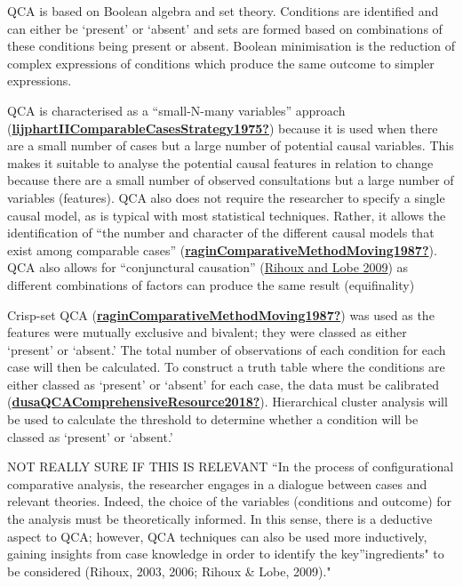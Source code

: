 \documentclass[
]{article}
\begin{document}
QCA is based on Boolean algebra and set theory. Conditions are
identified and can either be `present' or `absent' and sets are formed
based on combinations of these conditions being present or absent.
Boolean minimisation is the reduction of complex expressions of
conditions which produce the same outcome to simpler expressions.

QCA is characterised as a ``small-N-many variables'' approach
(\protect\hyperlink{ref-lijphartIIComparableCasesStrategy1975}{\textbf{lijphartIIComparableCasesStrategy1975?}})
because it is used when there are a small number of cases but a large
number of potential causal variables. This makes it suitable to analyse
the potential causal features in relation to change because there are a
small number of observed consultations but a large number of variables
(features). QCA also does not require the researcher to specify a single
causal model, as is typical with most statistical techniques. Rather, it
allows the identification of ``the number and character of the different
causal models that exist among comparable cases''
(\protect\hyperlink{ref-raginComparativeMethodMoving1987}{\textbf{raginComparativeMethodMoving1987?}}).
QCA also allows for ``conjunctural causation''
(\protect\hyperlink{ref-rihouxCaseQualitativeComparative2009}{Rihoux and
Lobe 2009}) as different combinations of factors can produce the same
result (equifinality)

Crisp-set QCA
(\protect\hyperlink{ref-raginComparativeMethodMoving1987}{\textbf{raginComparativeMethodMoving1987?}})
was used as the features were mutually exclusive and bivalent; they were
classed as either `present' or `absent.' The total number of
observations of each condition for each case will then be calculated. To
construct a truth table where the conditions are either classed as
`present' or `absent' for each case, the data must be calibrated
(\protect\hyperlink{ref-dusaQCAComprehensiveResource2018}{\textbf{dusaQCAComprehensiveResource2018?}}).
Hierarchical cluster analysis will be used to calculate the threshold to
determine whether a condition will be classed as `present' or `absent.'

NOT REALLY SURE IF THIS IS RELEVANT ``In the process of configurational
comparative analysis, the researcher engages in a dialogue between cases
and relevant theories. Indeed, the choice of the variables (conditions
and outcome) for the analysis must be theoretically informed. In this
sense, there is a deductive aspect to QCA; however, QCA techniques can
also be used more inductively, gaining insights from case knowledge in
order to identify the key''ingredients" to be considered (Rihoux, 2003,
2006; Rihoux \& Lobe, 2009)."
\end{document}
